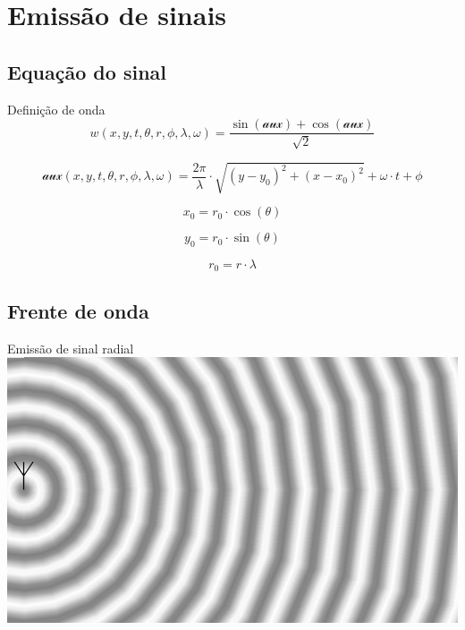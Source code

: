 
\section{Emissão de sinais}

    \subsection{Equação do sinal}
    \begin{frame}{Definição de onda}
        \begin{equation*}
            w(x, y, t, \theta, r, \phi, \lambda, \omega) = \frac{\sin\left(\mathcal{aux}\right)+ \cos\left(\mathcal{aux}\right)}{\sqrt{2}}
        \end{equation*}

        \begin{equation*}
            \mathcal{aux}(x, y, t, \theta, r, \phi, \lambda, \omega) =
            \frac{2\pi}{\lambda} \cdot \sqrt{(y - y_0)^2+(x - x_0)^2} + \omega \cdot t + \phi
        \end{equation*}

        \begin{equation*}
            x_0 = r_0 \cdot \cos(\theta)
        \end{equation*}

        \begin{equation*}
            y_0 = r_0 \cdot \sin(\theta)
        \end{equation*}

        \begin{equation*}
            r_0 = r \cdot \lambda
        \end{equation*}

    \end{frame}

    \subsection{Frente de onda}
    \begin{frame}{Emissão de sinal radial}
        \includegraphics{../pictures/signal.pdf}
    \end{frame}

